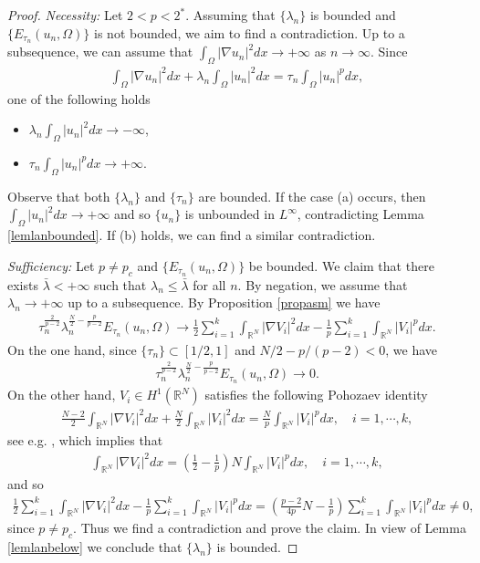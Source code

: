 \documentclass[10pt,a4paper]{article}
\theoremstyle{definition} \theoremstyle{remark}
\numberwithin{equation}{section}
\newcommand{\R}{\mathbb{R}}
\newcommand{\la}{\lambda}
\begin{document}
\begin{proof}
	\emph{Necessity:} Let $2 < p < 2^*$. Assuming that $\{\la_n\}$ is bounded and $\{E_{\tau_n}(u_n,\Omega)\}$ is not bounded, we aim to find a contradiction. Up to a subsequence, we can assume that $\int_\Omega |\nabla u_n|^2dx \to +\infty$ as $n \to \infty$. Since
	\begin{align*}
		\int_\Omega |\nabla u_n|^2dx + \la_n \int_\Omega |u_n|^2dx = \tau_n \int_\Omega |u_n|^pdx,
	\end{align*}
	one of the following holds
	\begin{itemize}
		\item[(a)] $\la_n \int_\Omega |u_n|^2dx \to -\infty$,
		\item[(b)] $\tau_n \int_\Omega |u_n|^pdx \to +\infty$.
	\end{itemize}
	Observe that both $\{\la_n\}$ and $\{\tau_n\}$ are bounded. If the case (a) occurs, then $\int_\Omega |u_n|^2dx \to +\infty$ and so $\{u_n\}$ is unbounded in $L^\infty$, contradicting Lemma \ref{lemlanbounded}. If (b) holds, we can find a similar contradiction.
	
	\vskip0.1in
	\emph{Sufficiency:} Let $p \neq p_c$ and $\{E_{\tau_n}(u_n,\Omega)\}$ be bounded. We claim that there exists $\bar \la < +\infty$ such that $\la_n \le \bar \la$ for all $n$. By negation, we assume that $\la_n \to +\infty$ up to a subsequence. By Proposition \ref{propasm} we have
	\begin{align} \label{eqlimitenergy}
		\tau_n^{\frac{2}{p-2}}\la_n^{\frac{N}{2} - \frac{p}{p-2}}E_{\tau_n}(u_n,\Omega) \to \frac12\sum_{i = 1}^{k}\int_{\R^N} |\nabla V_i|^2dx - \frac1p \sum_{i = 1}^{k}\int_{\R^N} |V_i|^pdx.
	\end{align}
    On the one hand, since $\{\tau_n\} \subset [1/2,1]$ and $N/2 - p/(p-2) < 0$, we have
    \begin{align*}
    	\tau_n^{\frac{2}{p-2}}\la_n^{\frac{N}{2} - \frac{p}{p-2}}E_{\tau_n}(u_n,\Omega) \to 0.
    \end{align*}
    On the other hand, $V_i \in H^1(\R^N)$ satisfies the following Pohozaev identity
    \begin{align*}
    	\frac{N-2}{2}\int_{\R^N}|\nabla V_i|^2dx + \frac{N}{2}\int_{\R^N}| V_i|^2dx = \frac{N}{p}\int_{\R^N}| V_i|^pdx, \quad i =1,\cdots,k,
    \end{align*}
    see e.g. \cite[Theorem B.3]{Willem}, which implies that
    \begin{align*}
    	\int_{\R^N}|\nabla V_i|^2dx = \left( \frac12 -\frac1p\right) N\int_{\R^N}| V_i|^pdx, \quad i =1,\cdots,k,
    \end{align*}
    and so
    \begin{align} \label{eqlpV}
    	\frac12\sum_{i = 1}^{k}\int_{\R^N} |\nabla V_i|^2dx - \frac1p \sum_{i = 1}^{k}\int_{\R^N} |V_i|^pdx = \left( \frac{p-2}{4p}N - \frac1p\right)\sum_{i = 1}^{k}\int_{\R^N} |V_i|^pdx \neq 0,
    \end{align}
    since $p \neq p_c$. Thus we find a contradiction and prove the claim. In view of Lemma \ref{lemlanbelow} we conclude that $\{\la_n\}$ is bounded.
	

\end{proof}
\end{document}
